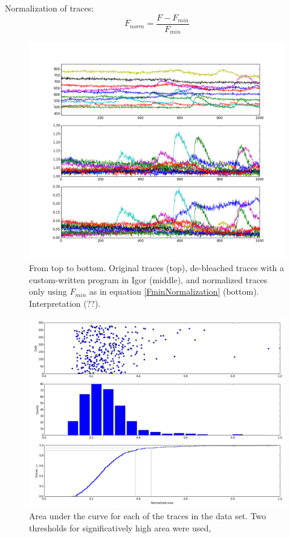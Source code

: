 \documentclass[10pt]{report}
\begin{document}
Normalization of {\calcium} traces:
\begin{equation}
F_{norm}= \frac{F - F_{min}}{F_{min}}
\label{FminNormalization}
\end{equation}

\begin{figure}
\includegraphics[width=\textwidth]{figures/F-FminOverFmin_CtxDaniel.png}
\caption{From top to bottom. Original {\calcium} traces (top), de-bleached traces with a custom-written program in Igor (middle), and normalized traces only using $F_{min}$ as in equation \eqref{FminNormalization} (bottom). Interpretation (??).}
\end{figure}

\begin{figure}
\includegraphics[width=\textwidth]{figures/AreasNormalizadas_CtxDaniel.png}
\caption{Area under the curve for each of the traces in the data set.  Two thresholds for significatively high area were used, }
\end{figure}
\end{document}
